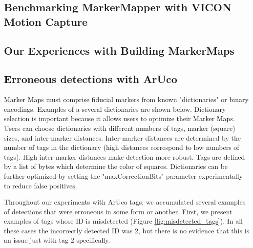 \documentclass{article}
\begin{document}
	\subsection{Benchmarking MarkerMapper with VICON Motion Capture}

	\subsection{Our Experiences with Building MarkerMaps}

	\subsection{Erroneous detections with ArUco}

    Marker Maps must comprise fiducial markers from known "dictionaries" or binary encodings. Examples of a several dictionaries are shown below. Dictionary selection is important because it allows users to optimize their Marker Maps. Users can choose dictionaries with different numbers of tags, marker (square) sizes, and inter-marker distances. Inter-marker distances are determined by the number of tags in the dictionary (high distances correspond to low numbers of tags). High inter-marker distances make detection more robust. Tags are defined by a list of bytes which determine the color of squares. Dictionaries can be further optimized by setting the "maxCorrectionBits" parameter experimentally to reduce false positives\cite{open_source_computer_vision_detection_2015}.

    Throughout our experiments with ArUco tags, we accumulated several examples of detections that were erroneous in some form or another. First, we present examples of tags whose ID is misdetected (Figure \ref{fig:misdetected_tags}). In all these cases the incorrectly detected ID was 2, but there is no evidence that this is an issue just with tag 2 specifically.
\end{document}
